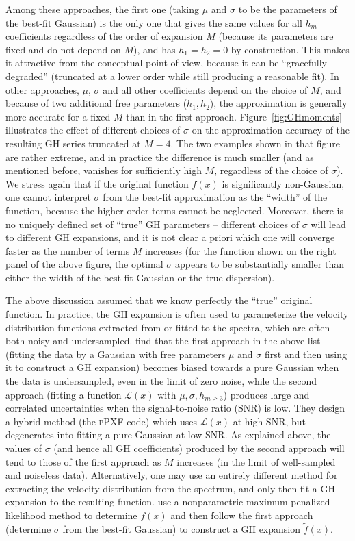 \documentclass[12pt]{article}
\begin{document}
Among these approaches, the first one (taking $\mu$ and $\sigma$ to be the parameters of the best-fit Gaussian) is the only one that gives the same values for all $h_m$ coefficients regardless of the order of expansion $M$ (because its parameters are fixed and do not depend on $M$), and has $h_1=h_2=0$ by construction. This makes it attractive from the conceptual point of view, because it can be ``gracefully degraded'' (truncated at a lower order while still producing a reasonable fit). In other approaches, $\mu$, $\sigma$ and all other coefficients depend on the choice of $M$, and because of two additional free parameters ($h_1,h_2$), the approximation is generally more accurate for a fixed $M$ than in the first approach. Figure~\ref{fig:GHmoments} illustrates the effect of different choices of $\sigma$ on the approximation accuracy of the resulting GH series truncated at $M=4$. The two examples shown in that figure are rather extreme, and in practice the difference is much smaller (and as mentioned before, vanishes for sufficiently high $M$, regardless of the choice of $\sigma$).
We stress again that if the original function $f(x)$ is significantly non-Gaussian, one cannot interpret $\sigma$ from the best-fit approximation as the ``width'' of the function, because the higher-order terms cannot be neglected. Moreover, there is no uniquely defined set of ``true'' GH parameters -- different choices of $\sigma$ will lead to different GH expansions, and it is not clear a priori which one will converge faster as the number of terms $M$ increases (for the function shown on the right panel of the above figure, the optimal $\sigma$ appears to be substantially smaller than either the width of the best-fit Gaussian or the true dispersion).

The above discussion assumed that we know perfectly the ``true'' original function. In practice, the GH expansion is often used to parameterize the velocity distribution functions extracted from or fitted to the spectra, which are often both noisy and undersampled.
\cite{CappellariEmsellem2004} find that the first approach in the above list (fitting the data by a Gaussian with free parameters $\mu$ and $\sigma$ first and then using it to construct a GH expansion) becomes biased towards a pure Gaussian when the data is undersampled, even in the limit of zero noise, while the second approach (fitting a function $\mathscr L(x)$ with $\mu,\sigma,h_{m\ge 3}$) produces large and correlated uncertainties when the signal-to-noise ratio (SNR) is low. They design a hybrid method (the \textsc{pPXF} code) which uses $\mathscr L(x)$ at high SNR, but degenerates into fitting a pure Gaussian at low SNR. As explained above, the values of $\sigma$ (and hence all GH coefficients) produced by the second approach will tend to those of the first approach as $M$ increases (in the limit of well-sampled and noiseless data).
Alternatively, one may use an entirely different method for extracting the velocity distribution from the spectrum, and only then fit a GH expansion to the resulting function. \cite{Joseph2001} use a nonparametric maximum penalized likelihood method to determine $f(x)$ and then follow the first approach (determine $\sigma$ from the best-fit Gaussian) to construct a GH expansion $\tilde f(x)$.
\end{document}
